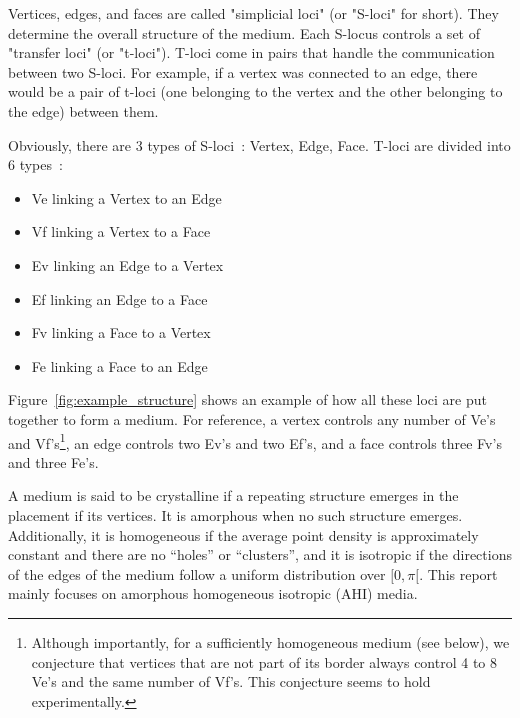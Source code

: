 \documentclass{article}
\begin{document}
Vertices, edges, and faces are called "simplicial loci" (or "S-loci" for short). They determine the overall structure of the medium. Each S-locus controls a set of "transfer loci" (or "t-loci"). T-loci come in pairs that handle the communication between two S-loci. For example, if a vertex was connected to an edge, there would be a pair of t-loci (one belonging to the vertex and the other belonging to the edge) between them.

\newcommand{\footnoteNbVeVf}{
	Although importantly, for a sufficiently homogeneous medium (see below), we conjecture that vertices that are not part of its border always control 4 to 8 Ve's and the same number of Vf's. This conjecture seems to hold experimentally.
}

Obviously, there are 3 types of S-loci~: Vertex, Edge, Face. T-loci are divided into 6 types~: 
\begin{itemize}[noitemsep,nosep]
	\item Ve linking a  Vertex to an Edge
	\item Vf linking a  Vertex to a  Face
	\item Ev linking an Edge   to a  Vertex
	\item Ef linking an Edge   to a  Face
	\item Fv linking a  Face   to a  Vertex
	\item Fe linking a  Face   to an Edge
\end{itemize}
Figure~\ref{fig:example_structure} shows an example of how all these loci are put together to form a medium. For reference, a vertex controls any number of Ve's and Vf's\footnote{\footnoteNbVeVf}, an edge controls two Ev's and two Ef's, and a face controls three Fv's and three Fe's.

A medium is said to be crystalline if a repeating structure emerges in the placement if its vertices. It is amorphous when no such structure emerges. Additionally, it is homogeneous if the average point density is approximately constant and there are no
“holes” or “clusters”, and it is isotropic if the directions of the edges of the medium follow a uniform distribution over $[0, \pi[$. This report mainly focuses on amorphous homogeneous isotropic (AHI) media.
\end{document}
